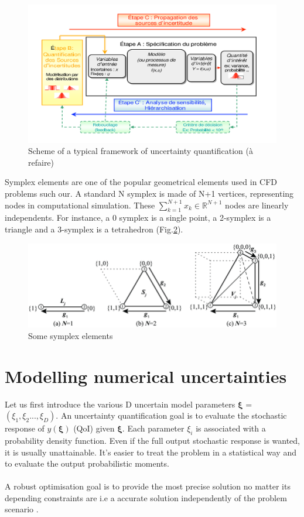 \documentclass[11pt, a4paper, English]{report}
\begin{document}
\begin{figure}[h!]
    \centering
    \includegraphics[width=\textwidth]{schema_lucor.png}
    \caption{Scheme of a typical framework of uncertainty quantification (à refaire)\cite{CoursLucor}}
    \label{schemalucor}
\end{figure}
Symplex elements are one of the popular geometrical elements used in CFD problems such our. A standard N symplex is made of N+1 vertices, representing nodes in computational simulation. These $\sum_{k=1}^{N+1}x_k \in \mathbb{R}^{N+1}$ nodes are linearly independents. For instance, a 0 symplex is a single point, a 2-symplex is a triangle and a 3-symplex is a tetrahedron (Fig.\ref{symplex}).
\begin{figure}[h!]
    \centering
    \includegraphics[width=\textwidth]{Simplex-Elements.png}
    \caption{Some symplex elements\cite{symplex}}
    \label{symplex}
\end{figure}

\section{Modelling numerical uncertainties}
Let us first introduce the various D uncertain model parameters $\boldsymbol{\xi}$ = $(\xi_1, \xi_2 ... , \xi_D)$. An uncertainty quantification goal is to evaluate the stochastic response of $y(\boldsymbol{\xi})$ (QoI) given $\boldsymbol{\xi}$. Each parameter $\xi_i$ is associated with a probability density function. Even if the full output stochastic response is wanted, it is usually unattainable. It's easier to treat the problem in a statistical way and to evaluate the output probabilistic moments.
\\\\
A robust optimisation goal is to provide the most precise solution no matter its depending constraints are i.e a accurate solution independently of the problem scenario \cite{robust}.
\end{document}

